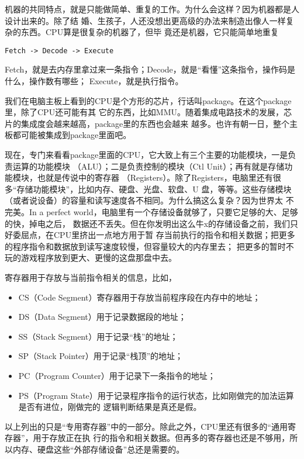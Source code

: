 \documentclass{wx672ctexart}
\newcommand\mpic[1]{%
  \marginpar{\texttt{[image: thumbnails/\#1]}}}
\begin{document}
机器的共同特点，就是只能做简单、重复的工作。为什么会这样？因为机器都是人设计出来的。除了结
婚、生孩子，人还没想出更高级的办法来制造出像人一样复杂的东西。CPU算是很复杂的机器了，但毕
竟还是机器，它只能简单地重复\mpic{pg_0020}
\begin{verbatim}
Fetch -> Decode -> Execute
\end{verbatim}

Fetch，就是去内存里拿过来一条指令；Decode，就是“看懂”这条指令，操作码是什么，操作数有哪些；
Execute，就是执行指令。

我们在电脑主板上看到的CPU是个方形的芯片，行话叫package。在这个package里，除了CPU还可能有其
它的东西，比如MMU。随着集成电路技术的发展，芯片的集成度会越来越高，package里的东西也会越来
越多。也许有朝一日，整个主板都可能被集成到package里面吧。

现在，专门来看看package里面的CPU，它大致上有三个主要的功能模块，一是负责运算的功能模块
（ALU）；二是负责控制的模块（Ctl Unit）；再有就是存储功能模块，也就是传说中的寄存器
（Registers）。除了Registers，电脑里还有很多“存储功能模块”，比如内存、硬盘、光盘、软盘、U
盘，等等。这些存储模块（或者说设备）的容量和读写速度各不相同。为什么搞这么复杂？因为世界太
不完美。In a perfect world，电脑里有一个存储设备就够了，只要它足够的大、足够的快，掉电之后，
数据还不丢失。但在你发明出这么牛x的存储设备之前，我们只好委屈点，在CPU里挤出一点地方用于暂
存当前执行的指令和相关数据；把更多的程序指令和数据放到读写速度较慢，但容量较大的内存里去；
把更多的暂时不玩的游戏程序放到更大、更慢的这盘那盘中去。

寄存器用于存放与当前指令相关的信息，比如，
\begin{itemize}
\item CS（Code Segment）寄存器用于存放当前程序段在内存中的地址；
\item DS（Data Segment）用于记录数据段的地址；
\item SS（Stack Segment）用于记录“栈”的地址；
\item SP（Stack Pointer）用于记录“栈顶”的地址；
\item PC（Program Counter）用于记录下一条指令的地址；
\item PS（Program State）用于记录程序指令的运行状态，比如刚做完的加法运算是否有进位，刚做完的
逻辑判断结果是真还是假。
\end{itemize}

以上列出的只是“专用寄存器”中的一部分。除此之外，CPU里还有很多的“通用寄存器”，用于存放正在执
行的指令和相关数据。但再多的寄存器也还是不够用，所以内存、硬盘这些“外部存储设备”总还是需要的。
\end{document}

